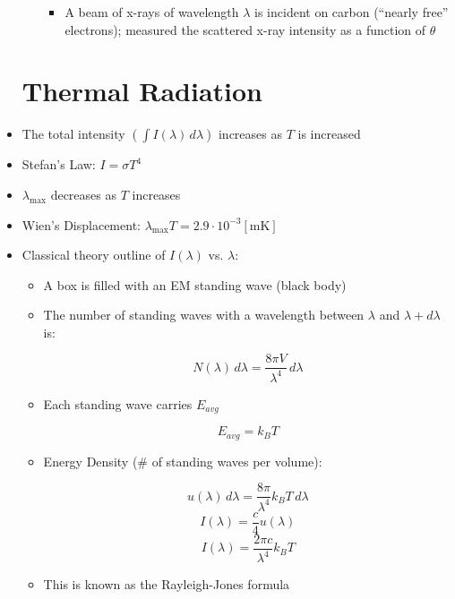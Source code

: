 \begin{itemize}
\begin{itemize}
\begin{itemize}
            \item A beam of x-rays of wavelength $\lambda$ is incident on carbon (``nearly free'' electrons); measured the scattered x-ray intensity as a function of $\theta$

          \end{itemize}

    \end{itemize}

    \section{Thermal Radiation}

  \item The total intensity $\left( \displaystyle \int I(\lambda)\,d\lambda \right)$ increases as $T$ is increased

  \item Stefan's Law: $I=\sigma T^4$

  \item $\lambda_{\text{max}}$ decreases as $T$ increases

  \item Wien's Displacement: $\lambda_{\text{max}}T=2.9\cdot10^{-3}[\si{\meter\kelvin}]$
    
  \item Classical theory outline of $I(\lambda)$ vs. $\lambda$:

    \begin{itemize}

      \item A box is filled with an EM standing wave (black body)

      \item The number of standing waves with a wavelength between $\lambda$ and $\lambda+d\lambda$ is:

        $$N(\lambda)\,d\lambda = \dfrac{8\pi V}{\lambda^4}\,d\lambda$$

      \item Each standing wave carries $E_{avg}$

        $$E_{avg}=k_BT$$

      \item Energy Density (\# of standing waves per volume):

        $$u(\lambda)\,d\lambda=\dfrac{8\pi}{\lambda^4}k_BT\,d\lambda$$
        $$I(\lambda)=\frac{c}{4}u(\lambda)$$
        $$\boxed{I(\lambda)=\dfrac{2\pi c}{\lambda^4}k_BT}$$

      \item This is known as the Rayleigh-Jones formula


\end{itemize}
\end{itemize}
